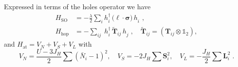 Expressed in terms of the holes operator we have
\begin{align}
    H_{\mathrm{SO}}
    &= -\frac{\lambda}{2} \sum_i  h_i^\dagger \, \big( \bm{\ell}  \cdot \bm{\sigma}\big) \,h_i^{\phantom{\dagger}} \; ,\\
     H_{\mathrm{hop}} &=  -\sum_{ij} \;  h_i^\dagger  \,  \tilde{\mathbf{T}}_{ij }    \,h_j^{\phantom{\dagger}} \;, \quad \tilde{\mathbf{T}}_{ij }=\left( \mathbf{T}_{ij } \otimes \mathbb{1}_2 \right),
\end{align} and $H_{\mathrm{at}}= V_N+V_S+V_L$ with
\begin{equation}
V_N =   \frac{U-3J_H}{2} \sum (\bar{N}_i-1)^2 , \quad
V_S = - 2J_H  \sum \mathbf{S}_i^2 , \quad
V_L = - \frac{J_H}{2} \sum \mathbf{L}_i^2 \; .
\end{equation}

